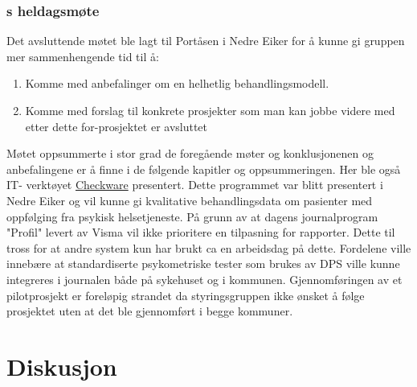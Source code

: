 \documentclass[11pt]{report} %
\begin{document}
                  \subsection{s heldagsmøte}\label{sec:agr_6}
                    Det avsluttende møtet ble lagt til Portåsen i Nedre Eiker for å kunne gi gruppen mer sammenhengende tid til å:
                      \begin{enumerate}
                        \item Komme med anbefalinger om en helhetlig behandlingsmodell.\\
                        \item Komme med forslag til konkrete prosjekter som man kan jobbe videre med etter dette for-prosjektet er avsluttet\\
                      \end{enumerate}
                    Møtet oppsummerte i stor grad de foregående møter og konklusjonenen og anbefalingene er å finne i de følgende kapitler og oppsummeringen. Her ble også IT- verktøyet \href{http://checkware.com/}{Checkware} presentert. Dette programmet var blitt presentert i Nedre Eiker og vil kunne gi kvalitative behandlingsdata om pasienter med oppfølging fra psykisk helsetjeneste. På grunn av at dagens journalprogram "Profil" levert av Visma vil ikke prioritere en tilpasning for rapporter. Dette til tross for at andre system kun har brukt ca en arbeidsdag på dette. Fordelene ville innebære at standardiserte psykometriske tester som brukes av DPS ville kunne integreres i journalen både på sykehuset og i kommunen. \label{cw_pilot}Gjennomføringen av et pilotprosjekt er foreløpig strandet da styringsgruppen ikke ønsket å følge prosjektet uten at det ble gjennomført i begge kommuner.


              \chapter{Diskusjon}\label{chap:disk}
\end{document}
